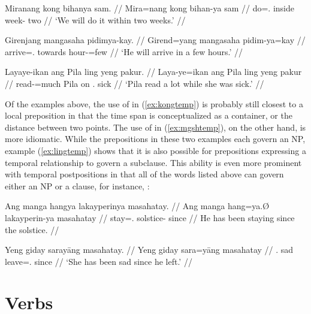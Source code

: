 \pex
\a\label{ex:kongtemp}\begingl
	\gla Miranang kong bihanya sam. //
	\glb Mira=nang kong bihan-ya sam //
	\glc do=\Fpl{}.\Aarg{} inside week-\Loc{} two //
	\glft `We will do it within two weeks.' //
\endgl

\a\label{ex:mgshtemp}\begingl
	\gla Girenjang mangasaha pidimya-kay. //
	\glb Girend=yang mangasaha pidim-ya=kay //
	\glc arrive=\TsgM{}.\Aarg{} towards hour-\Loc{}=few //
	\glft `He will arrive in a few hours.' //
\endgl

\a\label{ex:lingtemp}\begingl
	\gla Layaye-ikan ang Pila ling yeng pakur. //
	\glb Laya-ye=ikan ang Pila ling yeng pakur //
	\glc read-\TsgF{}=much \Aarg{} Pila on \TsgF{}.\Aarg{} sick //
	\glft `Pila read a lot while she was sick.' //
\endgl

\xe

Of the examples above, the use of  in (\ref{ex:kongtemp}) is
probably still closest to a local preposition in that the time span is
conceptualized as a container, or the distance between two points. The use of
 in (\ref{ex:mgshtemp}), on the other hand, is more
idiomatic. While the prepositions in these two examples each govern an NP,
example (\ref{ex:lingtemp}) shows that it is also possible for prepositions
expressing a temporal relationship to govern a subclause. This ability is even
more prominent with temporal postpositions in that all of the words listed
above can govern either an NP or a clause, for instance,
:

\pex
\a\label{ex:mshtaynp}\begingl
	\gla Ang manga hangya lakayperinya masahatay. //
	\glb Ang manga hang=ya.Ø lakayperin-ya masahatay //
	\glc \AgtT{} \Prog{} stay=\TsgM{}.\Top{} solstice-\Loc{} since //
	\glft He has been staying since the solstice. //
\endgl

\a\label{ex:mshtays}\begingl
	\gla Yeng giday sarayāng masahatay. //
	\glb Yeng giday sara=yāng masahatay //
	\glc \TsgF{}.\Aarg{} sad leave=\TsgM{}.\Aarg{} since //
	\glft `She has been sad since he left.' //
\endgl

\xe



\section{Verbs}

